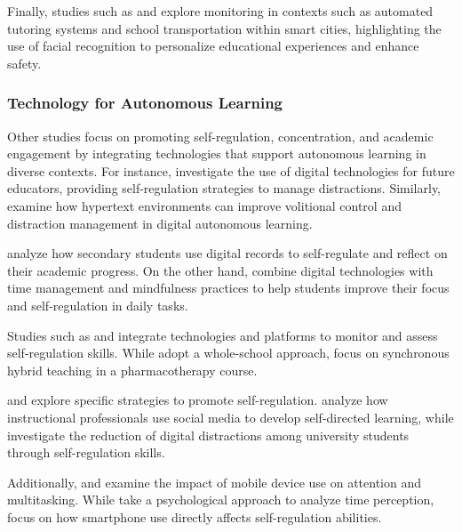 			Finally, studies such as \cite{Boumiza2017} and \cite{DaCosta2023} explore monitoring in contexts such as automated tutoring systems and school transportation within smart cities, highlighting the use of facial recognition to personalize educational experiences and enhance safety.
			
		\subsubsection{Technology for Autonomous Learning}
			Other studies focus on promoting self-regulation, concentration, and academic engagement by integrating technologies that support autonomous learning in diverse contexts. For instance, \cite{Bembich2016Future} investigate the use of digital technologies for future educators, providing self-regulation strategies to manage distractions. Similarly, \cite{Peters2003Self} examine how hypertext environments can improve volitional control and distraction management in digital autonomous learning.
			
			\cite{Roberts2020Task} analyze how secondary students use digital records to self-regulate and reflect on their academic progress. On the other hand, \cite{Adcroft2018Developing} combine digital technologies with time management and mindfulness practices to help students improve their focus and self-regulation in daily tasks.
			
			Studies such as \cite{Salter2014Exploring} and \cite{Palmer2022impact} integrate technologies and platforms to monitor and assess self-regulation skills. While \cite{Salter2014Exploring} adopt a whole-school approach, \cite{Palmer2022impact} focus on synchronous hybrid teaching in a pharmacotherapy course.
			
			\cite{Muljana2022Instructional} and \cite{Wang2022Empowering} explore specific strategies to promote self-regulation. \cite{Muljana2022Instructional} analyze how instructional professionals use social media to develop self-directed learning, while \cite{Wang2022Empowering} investigate the reduction of digital distractions among university students through self-regulation skills.
			
			Additionally, \cite{Hartley2022Smartphone} and \cite{Labar2019Interplay} examine the impact of mobile device use on attention and multitasking. While \cite{Labar2019Interplay} take a psychological approach to analyze time perception, \cite{Hartley2022Smartphone} focus on how smartphone use directly affects self-regulation abilities.
			
